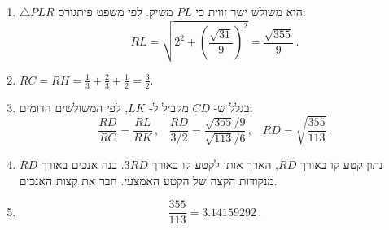 \begin{enumerate}
\item $\triangle PLR$
הוא משולש ישר זווית כי
$PL$
משיק. לפי משפט פיתגורס:
\[
RL=\sqrt{2^2+\left(\frac{\sqrt{31}}{9}\right)^2} = \frac{\sqrt{355}}{9}\,.
\]

\item $RC=RH=\displaystyle\frac{1}{3}+\frac{2}{3}+\frac{1}{2}=\frac{3}{2}$.

\item 
בגלל ש-%
$CD$
מקביל ל-%
$LK$,
לפי המשולשים הדומים:
\[
\frac{RD}{RC}=\frac{RL}{RK}\,,\;\;\;\frac{RD}{3/2}=\frac{\sqrt{355}/9}{\sqrt{113}/6}\,,\;\;\;RD=\sqrt{\frac{355}{113}}\,.
\]
\item
נתון קטע קו באורך
$RD$,
הארך אותו לקטע קו באורך
$3RD$.
בנה אנכים באורך
$RD$
מנקודות הקצה של הקטע האמצעי. חבר את קצות האנכים.
\begin{center}
\end{center}

\item \mbox{}
\[
\frac{355}{113}=3.14159292\,.
\]

\end{enumerate}


